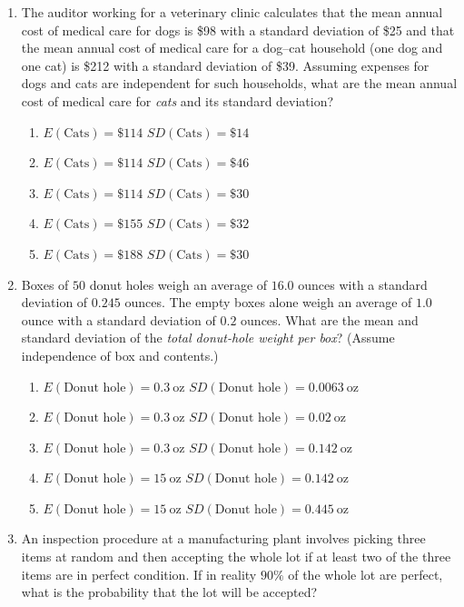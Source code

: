 \documentclass{article}
\begin{document}
\begin{enumerate}[label=\textbf{S\arabic*.}]
\item The auditor working for a veterinary clinic calculates that the mean annual cost of medical care for dogs is \$98 with a standard deviation of \$25 and that the mean annual cost of medical care for a dog–cat household (one dog and one cat) is \$212 with a standard deviation of \$39. Assuming expenses for dogs and cats are independent for such households, what are the mean annual cost of medical care for \emph{cats} and its standard deviation? 
\begin{enumerate}
  \item $E(\text{Cats})=\$114$ $SD(\text{Cats})=\$14$
  \item $E(\text{Cats})=\$114$ $SD(\text{Cats})=\$46$
  \item $E(\text{Cats})=\$114$ $SD(\text{Cats})=\$30$
  \item $E(\text{Cats})=\$155$ $SD(\text{Cats})=\$32$
  \item $E(\text{Cats})=\$188$ $SD(\text{Cats})=\$30$
\end{enumerate}

\item Boxes of $50$ donut holes weigh an average of $16.0$ ounces with a standard deviation of $0.245$ ounces. The empty boxes alone weigh an average of $1.0$ ounce with a standard deviation of $0.2$ ounces. What are the mean and standard deviation of the \emph{total donut-hole weight per box}? (Assume independence of box and contents.) 
\begin{enumerate}
  \item $E(\text{Donut hole})=0.3\ \text{oz}$ $SD(\text{Donut hole})=0.0063\ \text{oz}$
  \item $E(\text{Donut hole})=0.3\ \text{oz}$ $SD(\text{Donut hole})=0.02\ \text{oz}$
  \item $E(\text{Donut hole})=0.3\ \text{oz}$ $SD(\text{Donut hole})=0.142\ \text{oz}$
  \item $E(\text{Donut hole})=15\ \text{oz}$ $SD(\text{Donut hole})=0.142\ \text{oz}$
  \item $E(\text{Donut hole})=15\ \text{oz}$ $SD(\text{Donut hole})=0.445\ \text{oz}$
\end{enumerate}


\item An inspection procedure at a manufacturing plant involves picking three items at random and then accepting the whole lot if at least two of the three items are in perfect condition. If in reality $90\%$ of the whole lot are perfect, what is the probability that the lot will be accepted? 


\end{enumerate}
\end{document}
